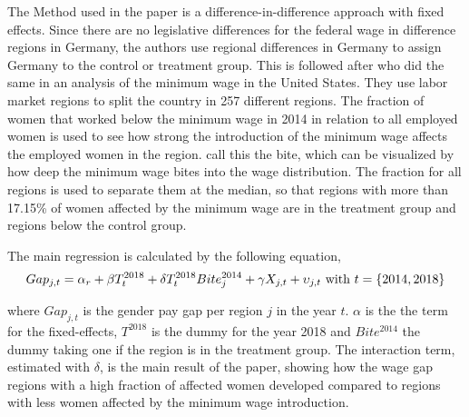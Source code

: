 \documentclass[12pt,draft,a4paper]{article}
\begin{document}

The Method used in the paper is a difference-in-difference approach with fixed effects. Since there are no legislative differences for the federal wage in difference regions in Germany, the authors use regional differences in Germany to assign Germany to the control or treatment group.
This is followed after \citet{Card1992} who did the same in an analysis of the minimum wage in the United States. 
They  use labor market regions to split the country in 257 different regions. 
The fraction of women that worked below the minimum wage in 2014 in relation to all employed women is used to see how 
strong %
the introduction of the minimum wage affects the employed women in the region. 
 call this the bite, which can be visualized by how deep the minimum wage bites into the wage distribution.
The fraction for all regions is used to separate them at the median, so that regions with more than 17.15\% of women affected by the minimum wage are in the treatment group and regions below the control group.

The main regression is calculated by the following equation,
\begin{equation}\label{equ:main}
    Gap_{j,t} = \alpha_r + \beta T_{t}^{2018} + \delta T_{t}^{2018} Bite_{j}^{2014} + \gamma X_{j,t} + \upsilon_{j,t} \textnormal{ with } t =\{2014, 2018\} 
\end{equation}

where $Gap_{j,t}$ is the gender pay gap per region $j$ in the year $t$. $ \alpha$ is the the term for the fixed-effects, $T^{2018}$ is the dummy for the year 2018 and $Bite^{2014}$ the dummy taking one if the region is in the treatment group.
The interaction term, estimated with $\delta$, is the main result of the paper, showing how the wage gap regions with a high fraction of affected women developed compared to regions with less women affected by the minimum wage introduction.
\end{document}
